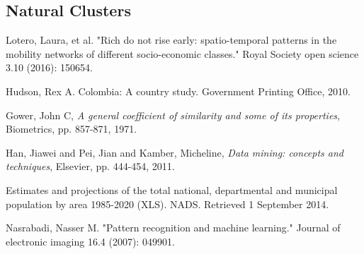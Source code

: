 \documentclass[runningheads]{llncs}
\begin{document}
	\subsection{Natural Clusters} \label{subsec: classification}
	
	

	
	
	
	
	
	
	
	
	
	
	\begin{thebibliography}{8}
		Lotero, Laura, et al. "Rich do not rise early: spatio-temporal patterns in the mobility networks of different socio-economic classes." Royal Society open science 3.10 (2016): 150654.
		
		Hudson, Rex A. Colombia: A country study. Government Printing Office, 2010.
		
		Gower, John C,
		\emph{A general coefficient of similarity and some of its properties},
		Biometrics, pp. 857-871,
		1971.
		
		Han, Jiawei and Pei, Jian and Kamber, Micheline,
		\emph{Data mining: concepts and techniques},
		Elsevier, pp. 444-454,
		2011.
		
		Estimates and projections of the total national, departmental and municipal population by area 1985-2020 (XLS). NADS. Retrieved 1 September 2014.
		
		Nasrabadi, Nasser M. "Pattern recognition and machine learning." Journal of electronic imaging 16.4 (2007): 049901.
	\end{thebibliography}
\end{document}
